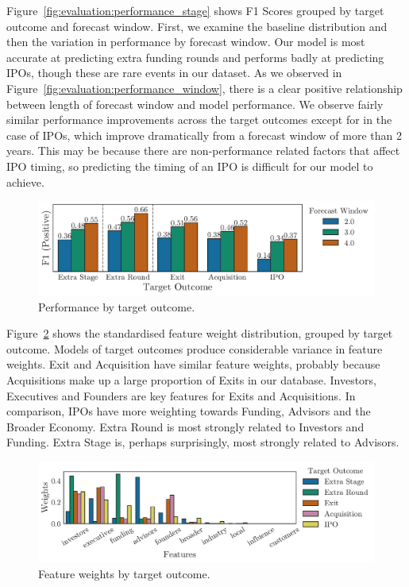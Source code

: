 \documentclass[../thesis/thesis.tex]{subfiles}
\begin{document}
Figure~\ref{fig:evaluation:performance_stage} shows F1 Scores grouped by target outcome and forecast window. First, we examine the baseline distribution and then the variation in performance by forecast window. Our model is most accurate at predicting extra funding rounds and performs badly at predicting IPOs, though these are rare events in our dataset. As we observed in Figure~\ref{fig:evaluation:performance_window}, there is a clear positive relationship between length of forecast window and model performance. We observe fairly similar performance improvements across the target outcomes except for in the case of IPOs, which improve dramatically from a forecast window of more than 2 years. This may be because there are non-performance related factors that affect IPO timing, so predicting the timing of an IPO is difficult for our model to achieve.

\begin{figure}[!htb]
    \centering
    \includegraphics[width=\textwidth]{../figures/evaluation/performance_outcome}
    \caption[Performance by target outcome]{Performance by target outcome.}
    \label{fig:evaluation:f1_predictive_outcome}
\end{figure}

Figure~\ref{fig:evaluation:features_outcome} shows the standardised feature weight distribution, grouped by target outcome. Models of target outcomes produce considerable variance in feature weights. Exit and Acquisition have similar feature weights, probably because Acquisitions make up a large proportion of Exits in our database. Investors, Executives and Founders are key features for Exits and Acquisitions. In comparison, IPOs have more weighting towards Funding, Advisors and the Broader Economy. Extra Round is most strongly related to Investors and Funding. Extra Stage is, perhaps surprisingly, most strongly related to Advisors.

\begin{figure}[!htb]
    \centering
    \includegraphics[width=\textwidth]{../figures/evaluation/features_outcome}
    \caption[Feature weights by target outcome]{Feature weights by target outcome.}
    \label{fig:evaluation:features_outcome}
\end{figure}

\end{document}
